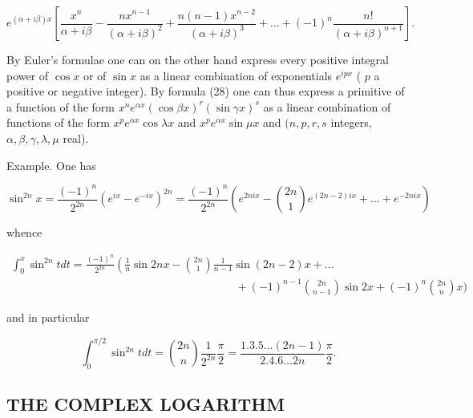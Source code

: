 \[
e ^ {(\alpha + i \beta) x} \left[ \frac {x ^ {n}}{\alpha + i \beta} - \frac {n x ^ {n - 1}}{(\alpha + i \beta) ^ {2}} + \frac {n (n - 1) x ^ {n - 2}}{(\alpha + i \beta) ^ {3}} + \dots + (- 1) ^ {n} \frac {n !}{(\alpha + i \beta) ^ {n + 1}} \right].
\]

By Euler's formulae one can on the other hand express every positive integral power of \(\cos x\) or of \(\sin x\) as a linear combination of exponentials \(e^{ipx}\) ( \(p\) a positive or negative integer). By formula (28) one can thus express a primitive of a function of the form \(x^n e^{\alpha x}(\cos \beta x)^r (\sin \gamma x)^s\) as a linear combination of functions of the form \(x^p e^{\alpha x}\cos \lambda x\) and \(x^p e^{\alpha x}\sin \mu x\) and \((n, p, r, s\) integers, \(\alpha, \beta, \gamma, \lambda, \mu\) real).

Example. One has

\[
\sin^ {2 n} x = \frac {(- 1) ^ {n}}{2 ^ {2 n}} \left(e ^ {i x} - e ^ {- i x}\right) ^ {2 n} = \frac {(- 1) ^ {n}}{2 ^ {2 n}} \left(e ^ {2 n i x} - \binom {2 n} {1} e ^ {(2 n - 2) i x} + \dots + e ^ {- 2 n i x}\right)
\]

whence

\[
\begin{array}{l} \int_ {0} ^ {x} \sin^ {2 n} t d t = \frac {(- 1) ^ {n}}{2 ^ {2 n}} \left(\frac {1}{n} \sin 2 n x - \binom {2 n} {1} \frac {1}{n - 1} \sin (2 n - 2) x + \dots \right. \\ \qquad \qquad \qquad \qquad \qquad \qquad \qquad \qquad \qquad \qquad + (- 1) ^ {n - 1} \binom {2 n} {n - 1} \sin 2 x + (- 1) ^ {n} \binom {2 n} {n} x \Bigg) \end{array}
\]

and in particular

\[
\int_ {0} ^ {\pi / 2} \sin^ {2 n} t   d t = \binom {2 n} {n} \frac {1}{2 ^ {2 n}}   \frac {\pi}{2} = \frac {1 . 3 . 5 \ldots (2 n - 1)}{2 . 4 . 6 \ldots 2 n}   \frac {\pi}{2}.\tag{29}
\]

\subsection{THE COMPLEX LOGARITHM}

